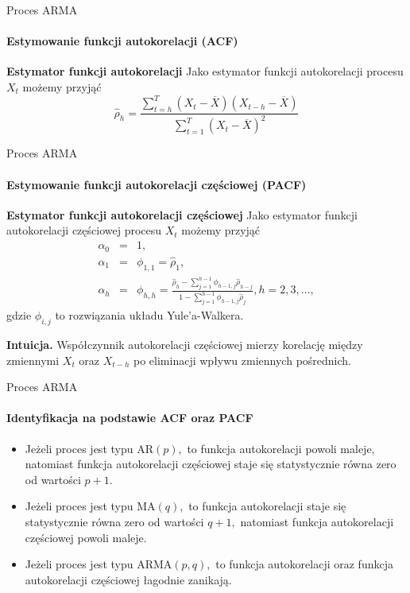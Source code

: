 \documentclass[a4paper, 11pt]{beamer}
\begin{document}
	\begin{frame}{Proces ARMA}
		\framesubtitle{Estymowanie funkcji autokorelacji (ACF)}
		\begin{block}{\textbf{Estymator funkcji autokorelacji}}
			Jako estymator funkcji autokorelacji procesu $X_t$ możemy przyjąć \[
				\hat{\rho}_h = \frac{\sum_{t=h}^{T}\left(X_t - \overline{X}\right)\left(X_{t-h} - \overline{X}\right)}{\sum_{t=1}^{T}\left(X_t - \overline{X}\right)^2}
			\]
		\end{block}
	\end{frame}
	
	\begin{frame}{Proces ARMA}
		\framesubtitle{Estymowanie funkcji autokorelacji częściowej (PACF)}
		\begin{block}{\textbf{Estymator funkcji autokorelacji częściowej}}
			Jako estymator funkcji autokorelacji częściowej procesu $X_t$ możemy przyjąć \begin{eqnarray*}
				\alpha_{0} & = & 1,\\
				\alpha_{1} & = & \phi_{1,1} = \hat{\rho}_1,\\
				\alpha_{h} & = & \phi_{h,h} = \frac{
					\hat{\rho}_h - \sum_{j=1}^{h-1} \phi_{h-1,j}{\hat{\rho}_{h-j}}
				}{
					1 - \sum_{j=1}^{h-1} \phi_{h-1,j} \hat{\rho}_j
				}, h = 2, 3, \ldots,
			\end{eqnarray*} gdzie $\phi_{i,j}$ to rozwiązania układu Yule'a-Walkera.
		\end{block}
		\begin{alert}{\textbf{Intuicja.}}
			Współczynnik autokorelacji częściowej mierzy korelację między zmiennymi
			$X_t$ oraz $X_{t-h}$ po eliminacji wpływu zmiennych pośrednich.
		\end{alert}
	\end{frame}
	
	\begin{frame}{Proces ARMA}
		\framesubtitle{Identyfikacja na podstawie ACF oraz PACF}
		\begin{itemize}
			\item Jeżeli proces jest typu $\mbox{AR}\left(p\right),$ to funkcja
				autokorelacji powoli maleje, natomiast funkcja autokorelacji częściowej
				staje się statystycznie równa zero od wartości $p + 1.$
			\item Jeżeli proces jest typu $\mbox{MA}\left(q\right),$ to funkcja
				autokorelacji staje się statystycznie równa zero od wartości $q + 1,$
				natomiast funkcja autokorelacji częściowej powoli maleje.
			\item Jeżeli proces jest typu $\mbox{ARMA}\left(p,q\right),$ to funkcja
				autokorelacji oraz funkcja autokorelacji częściowej łagodnie zanikają.
		\end{itemize}
	\end{frame}
	
\end{document}
